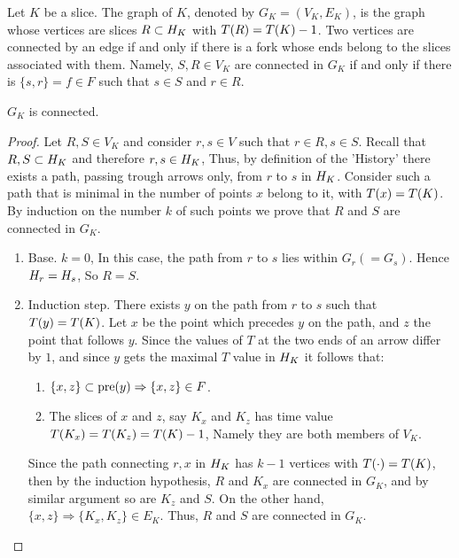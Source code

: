   \begin{definition}
    \label{def:gslice}
    Let $K$ be a slice. The graph of $K$, denoted by $G_{K} = (V_{K}, E_{K})$, is the graph whose vertices are slices $R \subset H_{K}$ with $T(R) = T(K) - 1$. Two vertices are connected by an edge if and only if there is a fork whose ends belong to the slices associated with them. Namely, $S, R \in V_{K}$ are connected in $G_{K}$ if and only if there is $\{s, r\} = f \in F$ such that $s \in S$ and $r \in R$.
  \end{definition}




  \begin{claim}
    \label{claim:connected}
    $G_{K}$ is connected. 
  \end{claim}

  \begin{proof}
    Let $R, S \in V_{K}$ and consider $r,s \in V$ such that $r \in R, s \in S$. Recall that $R,S \subset H_{K}$ and therefore $r,s \in H_{K}$, Thus, by definition of the 'History' there exists a path, passing trough arrows only, from $r$ to $s$ in $H_{K}$. Consider such a path that is minimal in the number of points $x$ belong to it, with $T(x) = T(K)$. By induction on the number $k$ of such points we prove that $R$ and $S$ are connected in $G_{K}$. 

    \begin{enumerate}
      \item Base. $k=0$, In this case, the path from $r$ to $s$ lies within $G_{r} (= G_{s})$. Hence $H_{r} = H_{s}$, So $R = S$. 
      \item Induction step. There exists $y$ on the path from $r$ to $s$ such that $T(y) = T(K)$. Let $x$ be the point which precedes $y$ on the path, and $z$ the point that follows $y$. Since the values of $T$ at the two ends of an arrow differ by $1$, and since $y$ gets the maximal $T$ value in $H_{K}$ it follows that: 
        \begin{enumerate}
          \item $\{x,z\} \subset \text{pre}(y) \Rightarrow \{x,z\} \in F$. 
          \item The slices of $x$ and $z$, say $K_{x}$ and $K_{z}$ has time value $T(K_{x}) = T(K_{z}) = T(K) -1$, Namely they are both members of $V_{K}$. 
        \end{enumerate}
        Since the path connecting $r,x$ in $H_{K}$ has $k-1$ vertices with $T(\cdot) = T(K)$, then by the induction hypothesis, $R$ and $K_{x}$ are connected in $G_{K}$, and by similar argument so are $K_{z}$ and $S$. On the other hand, $ \{x,z\} \Rightarrow \{K_{x},K_{z}\} \in E_{K}$. Thus, $R$ and $S$ are connected in $G_{K}$.
    \end{enumerate}
  \end{proof}

